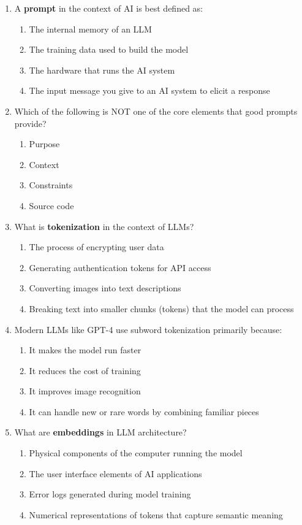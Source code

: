 \documentclass[11pt]{article}
\begin{document}
\begin{enumerate}

\item A \textbf{prompt} in the context of AI is best defined as:
\begin{enumerate}[label=\Alph*)]
    \item The internal memory of an LLM
    \item The training data used to build the model
    \item The hardware that runs the AI system
    \item The input message you give to an AI system to elicit a response
\end{enumerate}

\item Which of the following is NOT one of the core elements that good prompts provide?
\begin{enumerate}[label=\Alph*)]
    \item Purpose
    \item Context
    \item Constraints
    \item Source code
\end{enumerate}

\item What is \textbf{tokenization} in the context of LLMs?
\begin{enumerate}[label=\Alph*)]
    \item The process of encrypting user data
    \item Generating authentication tokens for API access
    \item Converting images into text descriptions
    \item Breaking text into smaller chunks (tokens) that the model can process
\end{enumerate}

\item Modern LLMs like GPT-4 use subword tokenization primarily because:
\begin{enumerate}[label=\Alph*)]
    \item It makes the model run faster
    \item It reduces the cost of training
    \item It improves image recognition
    \item It can handle new or rare words by combining familiar pieces
\end{enumerate}

\item What are \textbf{embeddings} in LLM architecture?
\begin{enumerate}[label=\Alph*)]
    \item Physical components of the computer running the model
    \item The user interface elements of AI applications
    \item Error logs generated during model training
    \item Numerical representations of tokens that capture semantic meaning
\end{enumerate}


\end{enumerate}
\end{document}
